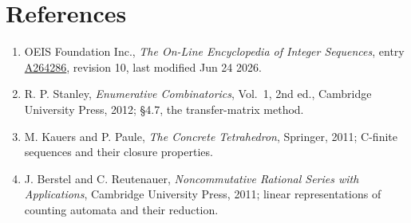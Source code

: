\documentclass[11pt]{article}
\theoremstyle{definition}
\begin{document}
\section{References}

\begin{enumerate}

\item OEIS Foundation Inc., \emph{The On-Line Encyclopedia of Integer Sequences}, entry \href{https://oeis.org/A264286}{A264286}, revision 10, last modified Jun 24 2026.

\item R. P. Stanley, \emph{Enumerative Combinatorics}, Vol.~1, 2nd ed., Cambridge University Press, 2012; \S4.7, the transfer-matrix method.

\item M. Kauers and P. Paule, \emph{The Concrete Tetrahedron}, Springer, 2011; C-finite sequences and their closure properties.

\item J. Berstel and C. Reutenauer, \emph{Noncommutative Rational Series with Applications}, Cambridge University Press, 2011; linear representations of counting automata and their reduction.

\end{enumerate}
\end{document}
